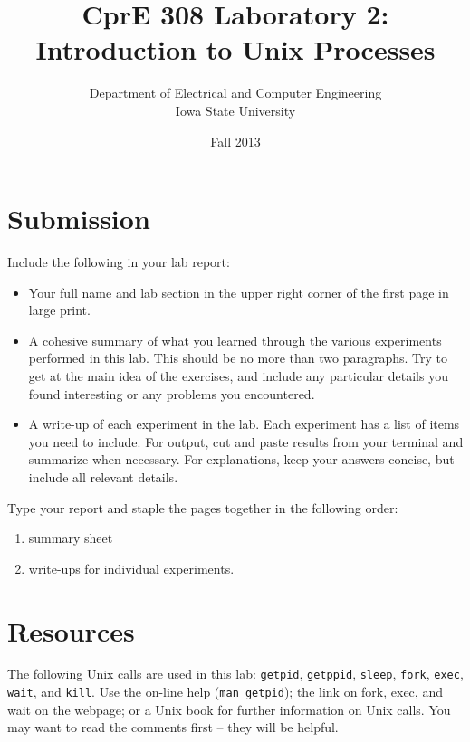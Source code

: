 \documentclass[letterpaper,10pt]{article}
\title{CprE 308 Laboratory 2: Introduction to Unix Processes}
\author{Department of Electrical and Computer Engineering \\ Iowa State University}
\date{Fall 2013}
\newcommand{\cmd}[1]{\texttt{#1}}
\begin{document}
\maketitle

\section{Submission}
Include the following in your lab report:
\begin{itemize}
 \item Your full name and lab section in the upper right corner of the first page in large print.
 \item A cohesive summary of what you learned through the various experiments performed in this
lab. This should be no more than two paragraphs. Try to get at the main idea of the
exercises, and include any particular details you found interesting or any problems you
encountered.
 \item A write-up of each experiment in the lab. Each experiment has a list of items you need to
include. For output, cut and paste results from your terminal and summarize when
necessary. For explanations, keep your answers concise, but include all relevant details.
\end{itemize}

Type your report and staple the pages together in the following order:
\begin{enumerate}
 \item summary sheet
 \item write-ups for individual experiments.
\end{enumerate}

\section{Resources}
The following Unix calls are used in this lab: \cmd{getpid}, \cmd{getppid}, \cmd{sleep}, \cmd{fork}, \cmd{exec}, \cmd{wait}, and \cmd{kill}.
Use the on-line help (\cmd{man getpid}); the link on fork, exec, and wait on the webpage; or a Unix book for
further information on Unix calls. You may want to read the comments first -- they will be helpful.
\end{document}
